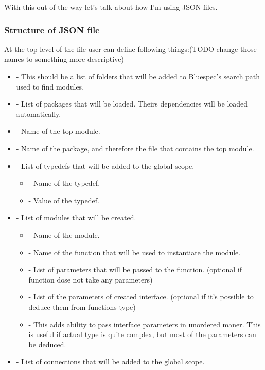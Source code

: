 \documentclass[14pt]{report}
\begin{document}
With this out of the way let's talk about how I'm using JSON files.
\subsubsection*{Structure of JSON file}
At the top level of the file user can define following things:(TODO change those names to something more descriptive)
\begin{itemize}
    \item {} - This should be a list of folders that will be added to Bluespec's search path used to find modules.
    \item {} - List of packages that will be loaded. Theirs dependencies will be loaded automatically.
    \item {} - Name of the top module.
    \item {} - Name of the package, and therefore the file that contains the top module.
    \item {} - List of typedefs that will be added to the global scope. \\
    \begin{itemize}
        \item {} - Name of the typedef.
        \item {} - Value of the typedef.
    \end{itemize}
    \item {} - List of modules that will be created. \\
    \begin{itemize}
        \item {} - Name of the module.
        \item {} - Name of the function that will be used to instantiate the module.
        \item {} - List of parameters that will be passed to the function. (optional if function dose not take any parameters)
        \item {} - List of the parameters of created interface. (optional if it's possible to deduce them from functions type)
        \item {} - This adds ability to pass interface parameters in unordered maner. This is useful if actual type is quite complex, but most of the parameters can be deduced.
    \end{itemize}
    \item {} - List of connections that will be added to the global scope. \\

\end{itemize}
\end{document}
